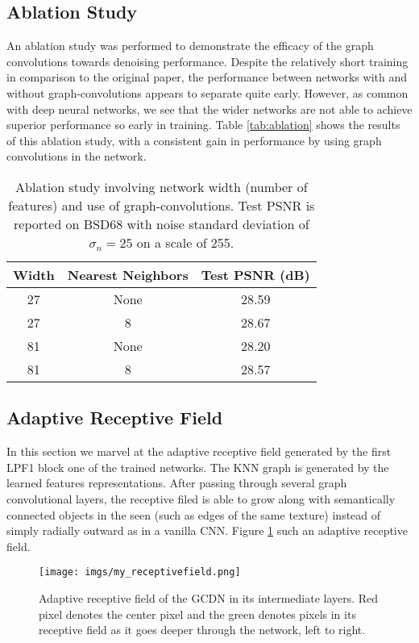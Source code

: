 \documentclass[12pt,a4paper,reqno]{amsart}
\begin{document}
\subsection{Ablation Study}
An ablation study was performed to demonstrate the efficacy of the graph
convolutions towards denoising performance. Despite the relatively short training
in comparison to the original paper, the performance between networks with and
without graph-convolutions appears to separate quite early. However, as common
with deep neural networks, we see that the wider networks are not able to
achieve superior performance so early in training. Table \ref{tab:ablation}
shows the results of this ablation study, with a consistent gain in performance
by using graph convolutions in the network.

\begin{table}[ht]
\centering
\begin{tabular}{c|c|c} \hline
Width & Nearest Neighbors & Test PSNR (dB) \\\hline
27 & None & 28.59 \\
27 & 8    & 28.67  \\
81 & None & 28.20  \\
81 & 8 &    28.57  \\\hline
\end{tabular}%
\caption{Ablation study involving network width (number of features) and use of
graph-convolutions. Test PSNR is reported on BSD68 with noise standard deviation
of $\sigma_n = 25$ on a scale of 255.}
\end{table}

\subsection{Adaptive Receptive Field}
In this section we marvel at the adaptive receptive field generated by the first
LPF1 block one of the trained networks. The KNN graph is generated by the
learned features representations. After passing through several graph
convolutional layers, the receptive filed is able to grow along with
semantically connected objects in the seen (such as edges of the same texture)
instead of simply radially outward as in a vanilla CNN. Figure
\ref{fig:receptive} such an adaptive receptive field.

\begin{figure}
\centering
\texttt{[image: imgs/my\_receptivefield.png]}
\caption{Adaptive receptive field of the GCDN in its intermediate layers. Red
pixel denotes the center pixel and the green denotes pixels in its receptive
field as it goes deeper through the network, left to right. }
\label{fig:receptive}
\end{figure}
\end{document}
